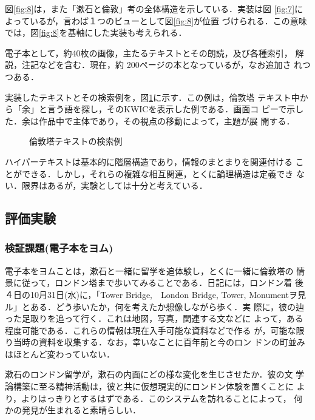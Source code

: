 図\ref{fig:8}は，また「漱石と倫敦」考の全体構造を示している．実装は図
\ref{fig:7}によっているが，言わば１つのビューとして図\ref{fig:8}が位置
づけられる．この意味では，図\ref{fig:8}を基軸にした実装も考えられる．

電子本として，約40枚の画像，主たるテキストとその朗読，及び各種索引，
解説，注記などを含む．現在，約 200ページの本となっているが，なお追加さ
れつつある．

実装したテキストとその検索例を，図\ref{fig:9}に示す．この例は，倫敦塔
テキスト中から「余」と言う語を探し，そのKWICを表示した例である．画面コ
ピーで示した．余は作品中で主体であり，その視点の移動によって，主題が展
開する．

\begin{figure}[htb]
\begin{center}
  
  \caption{倫敦塔テキストの検索例}\label{fig:9}
\end{center}
\end{figure}

ハイパーテキストは基本的に階層構造であり，情報のまとまりを関連付ける
ことができる．しかし，それらの複雑な相互関連，とくに論理構造は定義でき
ない．限界はあるが，実験としては十分と考えている．

\subsection{評価実験}

\subsubsection{検証課題(電子本をヨム)}
電子本をヨムことは，漱石と一緒に留学を追体験し，とくに一緒に倫敦塔の
情景に従って，ロンドン塔まで歩いてみることである．日記には，ロンドン着
後４日の10月31日(水)に，「Tower Bridge,　London Bridge, Tower,
Monumentヲ見ル」とある．どう歩いたか，何を考えたか想像しながら歩く．実
際に，彼の辿った足取りを追って行く．これは地図，写真，関連する文などに
よって，ある程度可能である．これらの情報は現在入手可能な資料などで作る
が，可能な限り当時の資料を収集する．なお，幸いなことに百年前と今のロン
ドンの町並みはほとんど変わっていない．

漱石のロンドン留学が，漱石の内面にどの様な変化を生じさせたか．彼の文
学論構築に至る精神活動は，彼と共に仮想現実的にロンドン体験を置くことに
より，よりはっきりとするはずである．このシステムを訪れることによって，
何かの発見が生まれると素晴らしい．

